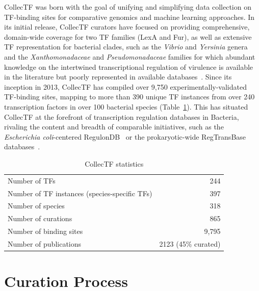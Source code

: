 CollecTF was born with the goal of unifying and simplifying data collection on
TF-binding sites for comparative genomics and machine learning approaches. In
its initial release, CollecTF curators have focused on providing comprehensive,
domain-wide coverage for two TF families (LexA and Fur), as well as extensive
TF representation for bacterial clades, such as the \textit{Vibrio} and
\textit{Yersinia} genera and the \textit{Xanthomonadaceae} and
\textit{Pseudomonadaceae} families for which
abundant knowledge on the intertwined transcriptional regulation of virulence
is available in the literature but poorly represented in available
databases~\citep{matson2007regulatory}. Since its inception in 2013, CollecTF
has compiled over 9,750 experimentally-validated TF-binding sites, mapping to
more than 390 unique TF instances from over 240 transcription factors in over
100 bacterial species (Table~\ref{tab:collectf-stats}). This has situated
CollecTF at the forefront of transcription regulation databases in Bacteria,
rivaling the content and breadth of comparable initiatives, such as the
\textit{Escherichia coli}-centered RegulonDB~\citep{salgado2013regulondb} or the
prokaryotic-wide RegTransBase databases~\citep{kazakov2007regtransbase}.

\begin{table}
  \centering
  \caption{CollecTF statistics}
  \begin{tabular}{l r}
    \toprule
    Number of TFs & 244\\
    Number of TF instances (species-specific TFs) & 397\\
    Number of species & 318\\
    Number of curations & 865\\
    Number of binding sites & 9,795\\
    Number of publications & 2123 (45\% curated)\\
    \bottomrule
  \end{tabular}
  \label{tab:collectf-stats}
\end{table}

\section{Curation Process}


